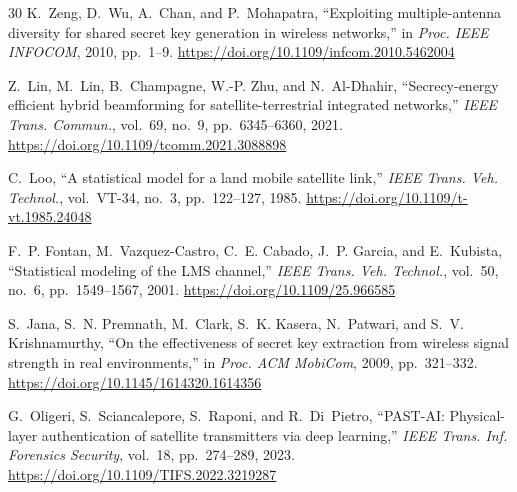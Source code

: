 \documentclass[conference,a4paper]{IEEEtran}
\begin{document}
\begin{thebibliography}{30}
K.~Zeng, D.~Wu, A.~Chan, and P.~Mohapatra, ``Exploiting multiple-antenna diversity for shared secret key generation in wireless networks,'' in \emph{Proc. IEEE INFOCOM}, 2010, pp.~1--9.
\url{https://doi.org/10.1109/infcom.2010.5462004}

Z.~Lin, M.~Lin, B.~Champagne, W.-P. Zhu, and N.~Al-Dhahir, ``Secrecy-energy efficient hybrid beamforming for satellite-terrestrial integrated networks,'' \emph{IEEE Trans. Commun.}, vol.~69, no.~9, pp.~6345--6360, 2021.
\url{https://doi.org/10.1109/tcomm.2021.3088898}

C.~Loo, ``A statistical model for a land mobile satellite link,'' \emph{IEEE Trans. Veh. Technol.}, vol.~VT-34, no.~3, pp.~122--127, 1985.
\url{https://doi.org/10.1109/t-vt.1985.24048}

F.~P. Fontan, M.~Vazquez-Castro, C.~E. Cabado, J.~P. Garcia, and E.~Kubista, ``Statistical modeling of the LMS channel,'' \emph{IEEE Trans. Veh. Technol.}, vol.~50, no.~6, pp.~1549--1567, 2001.
\url{https://doi.org/10.1109/25.966585}

S.~Jana, S.~N. Premnath, M.~Clark, S.~K. Kasera, N.~Patwari, and S.~V. Krishnamurthy, ``On the effectiveness of secret key extraction from wireless signal strength in real environments,'' in \emph{Proc. ACM MobiCom}, 2009, pp.~321--332.
\url{https://doi.org/10.1145/1614320.1614356}

G.~Oligeri, S.~Sciancalepore, S.~Raponi, and R.~Di~Pietro, ``PAST-AI: Physical-layer authentication of satellite transmitters via deep learning,'' \emph{IEEE Trans. Inf. Forensics Security}, vol.~18, pp.~274--289, 2023.
\url{https://doi.org/10.1109/TIFS.2022.3219287}

\end{thebibliography}
\end{document}
